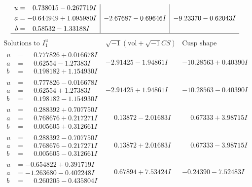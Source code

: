 \documentclass[1p]{elsarticle_modified}
\theoremstyle{definition}
\newcommand{\I}{\sqrt{-1}}
\begin{document}
$$\begin{array}{c|c|c}
\begin{aligned}
u &= \phantom{-}0.738015 - 0.267719 I \\
a &= -0.644949 + 1.095980 I \\
b &= \phantom{-}0.58532 - 1.33188 I\end{aligned}
 & -2.67687 - 0.69646 I & -9.23370 - 0.62043 I\\
 \hline 
 \end{array}$$\newpage$$\begin{array}{c|c|c}  
\text{Solutions to }I^u_{1}& \I (\text{vol} + \sqrt{-1}CS) & \text{Cusp shape}\\
 \hline 
\begin{aligned}
u &= \phantom{-}0.777826 + 0.016678 I \\
a &= \phantom{-}0.62554 - 1.27383 I \\
b &= \phantom{-}0.198182 + 1.154930 I\end{aligned}
 & -2.91425 - 1.94861 I & -10.28563 + 0.40390 I \\ \hline\begin{aligned}
u &= \phantom{-}0.777826 - 0.016678 I \\
a &= \phantom{-}0.62554 + 1.27383 I \\
b &= \phantom{-}0.198182 - 1.154930 I\end{aligned}
 & -2.91425 + 1.94861 I & -10.28563 - 0.40390 I \\ \hline\begin{aligned}
u &= \phantom{-}0.288392 + 0.707750 I \\
a &= \phantom{-}0.768676 + 0.217271 I \\
b &= \phantom{-}0.005605 + 0.312661 I\end{aligned}
 & \phantom{-}0.13872 - 2.01683 I & \phantom{-}0.67333 + 3.98715 I \\ \hline\begin{aligned}
u &= \phantom{-}0.288392 - 0.707750 I \\
a &= \phantom{-}0.768676 - 0.217271 I \\
b &= \phantom{-}0.005605 - 0.312661 I\end{aligned}
 & \phantom{-}0.13872 + 2.01683 I & \phantom{-}0.67333 - 3.98715 I \\ \hline\begin{aligned}
u &= -0.654822 + 0.391719 I \\
a &= -1.263680 - 0.402248 I \\
b &= \phantom{-}0.260205 - 0.435804 I\end{aligned}
 & \phantom{-}0.67894 + 7.53424 I & -0.24390 - 7.52483 I \\ \hline\begin{aligned}

\end{aligned}
\end{array}$$
\end{document}
